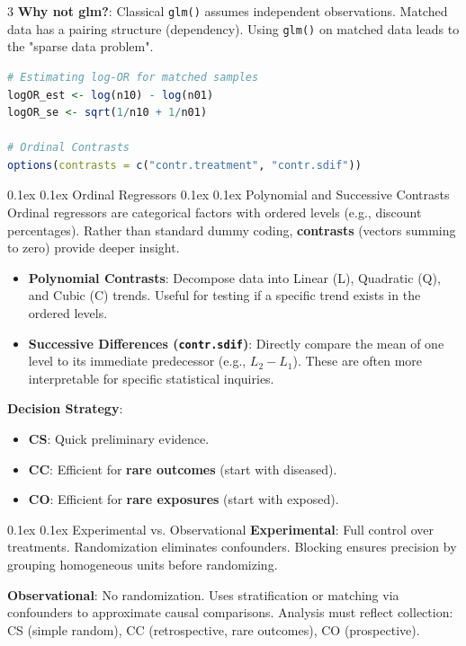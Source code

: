 \documentclass[8pt,landscape]{article}
\makeatletter
\renewcommand{\section}{\@startsection{section}{2}{0pt}%
    {0.1ex}%
    {0.1ex}%
    {\fontsize{8}{9}\bfseries\color{red}}} %
\renewcommand{\subsection}{\@startsection{subsection}{2}{0pt}%
    {0.1ex}%
    {0.1ex}%
    {\fontsize{8}{9}\bfseries\color{blue}}} %
\newcommand{\code}[1]{\textcolor{myred}{\texttt{#1}}}
\makeatother
\begin{document}
\begin{multicols}{3}
\textbf{Why not glm?}: Classical \code{glm()} assumes independent observations. Matched data has a pairing structure (dependency). Using \code{glm()} on matched data leads to the "sparse data problem".

\begin{lstlisting}[language=R]
# Estimating log-OR for matched samples
logOR_est <- log(n10) - log(n01)
logOR_se <- sqrt(1/n10 + 1/n01)

# Ordinal Contrasts
options(contrasts = c("contr.treatment", "contr.sdif"))
\end{lstlisting}

\section{Ordinal Regressors}
\subsection{Polynomial and Successive Contrasts}
Ordinal regressors are categorical factors with ordered levels (e.g., discount percentages). Rather than standard dummy coding, \textbf{contrasts} (vectors summing to zero) provide deeper insight.
\begin{itemize}
    \item \textbf{Polynomial Contrasts}: Decompose data into Linear (L), Quadratic (Q), and Cubic (C) trends. Useful for testing if a specific trend exists in the ordered levels.
    \item \textbf{Successive Differences (\code{contr.sdif})}: Directly compare the mean of one level to its immediate predecessor (e.g., $L_2 - L_1$). These are often more interpretable for specific statistical inquiries.
\end{itemize}

\textbf{Decision Strategy}:
\begin{itemize}
    \item \textbf{CS}: Quick preliminary evidence.
    \item \textbf{CC}: Efficient for \textbf{rare outcomes} (start with diseased).
    \item \textbf{CO}: Efficient for \textbf{rare exposures} (start with exposed).
\end{itemize}

\subsection{Experimental vs. Observational}
\textbf{Experimental}: Full control over treatments. Randomization eliminates confounders. Blocking ensures precision by grouping homogeneous units before randomizing.

\textbf{Observational}: No randomization. Uses stratification or matching via confounders to approximate causal comparisons. Analysis must reflect collection: CS (simple random), CC (retrospective, rare outcomes), CO (prospective).

\end{multicols}
\end{document}
